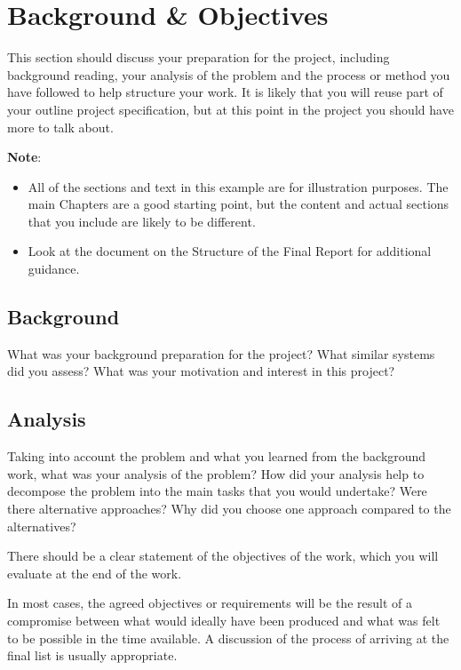 \chapter{Background \& Objectives}

This section should discuss your preparation for the project, including background reading, your analysis of the problem and the process or method you have followed to help structure your work.  It is likely that you will reuse part of your outline project specification, but at this point in the project you should have more to talk about. 

\textbf{Note}: 

\begin{itemize}
   \item All of the sections and text in this example are for illustration purposes. The main Chapters are a good starting point, but the content and actual sections that you include are likely to be different.
   
   \item Look at the document on the Structure of the Final Report for additional guidance. 
   
\end {itemize}

\section{Background}
What was your background preparation for the project? What similar systems did you assess? What was your motivation and interest in this project? 

\section{Analysis}
Taking into account the problem and what you learned from the background work, what was your analysis of the problem? How did your analysis help to decompose the problem into the main tasks that you would undertake? Were there alternative approaches? Why did you choose one approach compared to the alternatives? 

There should be a clear statement of the objectives of the work, which you will evaluate at the end of the work. 

In most cases, the agreed objectives or requirements will be the result of a compromise between what would ideally have been produced and what was felt to be possible in the time available. A discussion of the process of arriving at the final list is usually appropriate.

